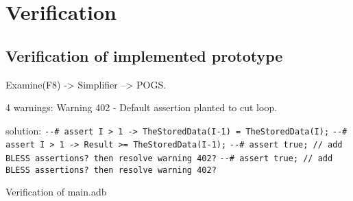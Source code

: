 
\cleardoublepage

\chapter{Verification}
\label{verification}

\section{Verification of implemented prototype}
\label{verification:prototype}

Examine(F8) -> Simplifier --> POGS.

4 warnings:
Warning 402 - Default assertion planted to cut loop.

solution:
\lstinline{--# assert I > 1 -> TheStoredData(I-1) = TheStoredData(I);}
\lstinline{--# assert I > 1 -> Result >= TheStoredData(I-1);}
\lstinline{--# assert true; // add BLESS assertions? then resolve warning 402?}
\lstinline{--# assert true; // add BLESS assertions? then resolve warning 402?}


Verification of main.adb


